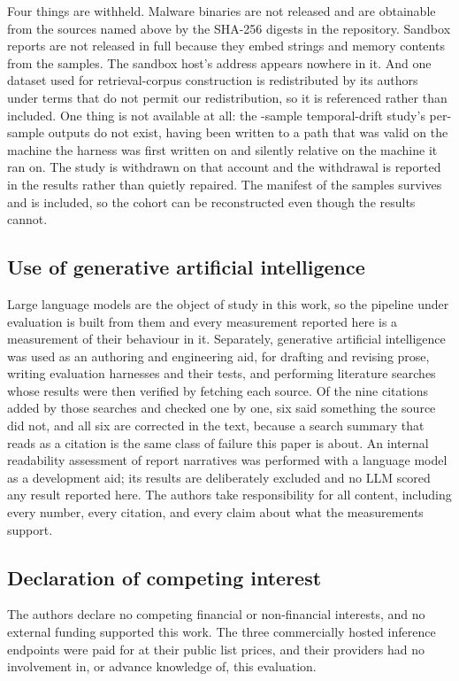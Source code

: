 Four things are withheld. Malware binaries are not released and are obtainable from the sources
named above by the SHA-256 digests in the repository. Sandbox reports are not released in full because
they embed strings and memory contents from the samples. The sandbox host's address appears nowhere
in it. And one dataset used for retrieval-corpus construction is redistributed by its
authors under terms that do not permit our redistribution, so it is referenced rather than included.
One thing is not available at all: the -sample temporal-drift study's per-sample
outputs do not exist, having been written to a path that was valid on the machine the harness was
first written on and silently relative on the machine it ran on. The study is withdrawn on that
account and the withdrawal is reported in the results rather than quietly repaired. The manifest of
the  samples survives and is included, so the cohort can be reconstructed even though
the results cannot.

\subsection*{Use of generative artificial intelligence}\label{use-of-generative-ai}

Large language models are the object of study in this work, so the pipeline under evaluation is
built from them and every measurement reported here is a measurement of their behaviour in it.
Separately, generative artificial intelligence was used as an authoring and engineering aid, for drafting and revising
prose, writing evaluation harnesses and their tests, and performing literature searches whose
results were then verified by fetching each source. Of the nine citations added by those searches and checked
one by one, six said something
the source did not, and all six are corrected in the text, because a search summary that reads as a
citation is the same class of failure this paper is about. An internal
readability assessment of report narratives was performed with a language model as a development
aid; its results are deliberately excluded and no LLM scored any result reported here. The authors
take responsibility for all content, including every number, every citation, and every claim about
what the measurements support.

\subsection*{Declaration of competing interest}\label{competing-interests}

The authors declare no competing financial or non-financial interests, and no external funding
supported this work. The three commercially hosted inference endpoints were paid for at their public
list prices, and their providers had no involvement in, or advance knowledge of, this evaluation.
